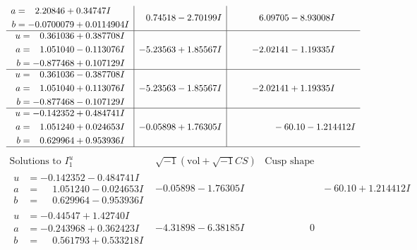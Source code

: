 \documentclass[1p]{elsarticle_modified}
\theoremstyle{definition}
\newcommand{\I}{\sqrt{-1}}
\begin{document}
$$\begin{array}{c|c|c}
\begin{aligned}
a &= \phantom{-}2.20846 + 0.34747 I \\
b &= -0.0700079 + 0.0114904 I\end{aligned}
 & \phantom{-}0.74518 - 2.70199 I & \phantom{-}6.09705 - 8.93008 I \\ \hline\begin{aligned}
u &= \phantom{-}0.361036 + 0.387708 I \\
a &= \phantom{-}1.051040 - 0.113076 I \\
b &= -0.877468 + 0.107129 I\end{aligned}
 & -5.23563 + 1.85567 I & -2.02141 - 1.19335 I \\ \hline\begin{aligned}
u &= \phantom{-}0.361036 - 0.387708 I \\
a &= \phantom{-}1.051040 + 0.113076 I \\
b &= -0.877468 - 0.107129 I\end{aligned}
 & -5.23563 - 1.85567 I & -2.02141 + 1.19335 I \\ \hline\begin{aligned}
u &= -0.142352 + 0.484741 I \\
a &= \phantom{-}1.051240 + 0.024653 I \\
b &= \phantom{-}0.629964 + 0.953936 I\end{aligned}
 & -0.05898 + 1.76305 I & \phantom{-0.000000 }      -6
0. 10   - 1.214412 I\\
 \hline 
 \end{array}$$\newpage$$\begin{array}{c|c|c}  
\text{Solutions to }I^u_{1}& \I (\text{vol} + \sqrt{-1}CS) & \text{Cusp shape}\\
 \hline 
\begin{aligned}
u &= -0.142352 - 0.484741 I \\
a &= \phantom{-}1.051240 - 0.024653 I \\
b &= \phantom{-}0.629964 - 0.953936 I\end{aligned}
 & -0.05898 - 1.76305 I & \phantom{-0.000000 -}     -6
0. 10   + 1.214412 I \\ \hline\begin{aligned}
u &= -0.44547 + 1.42740 I \\
a &= -0.243968 + 0.362423 I \\
b &= \phantom{-}0.561793 + 0.533218 I\end{aligned}
 & -4.31898 - 6.38185 I & \phantom{-0.000000 } 0 \\ \hline\begin{aligned}

\end{aligned}
\end{array}$$
\end{document}
